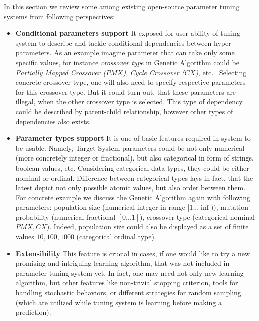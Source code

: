 In this section we review some among existing open-source parameter tuning systems from following perspectives:%
\begin{itemize}
	\item \textbf{Conditional parameters support} It exposed for user ability of tuning system to describe and tackle conditional dependencies between hyper-parameters. As an example imagine parameter that can take only some specific values, for instance \textit{crossover type} in Genetic Algorithm could be \textit{Partially Mapped Crossover ($PMX$)}, \textit{Cycle Crossover ($CX$)}, etc.~\cite{larranaga1999genetic} Selecting concrete crossover type, one will also need to specify respective parameters for this crossover type. But it could turn out, that these parameters are illegal, when the other crossover type is selected. This type of dependency could be described by parent-child relationship, however other types of dependencies also exists.
	
	\item \textbf{Parameter types support} It is one of basic features required in system to be usable. Namely, Target System parameters could be not only numerical (more concretely integer or fractional), but also categorical in form of strings, boolean values, etc. Considering categorical data types, they could be either nominal or ordinal. Difference between categorical types lays in fact, that the latest depict not only possible atomic values, but also order between them. For concrete example we discuss the Genetic Algorithm again with following parameters: population size (numerical integer in range $[1...\inf)$), mutation probability (numerical fractional $[0...1]$), crossover type (categorical nominal ${PMX, CX}$). Indeed, population size could also be displayed as a set of finite values ${10, 100, 1000}$ (categorical ordinal type).
	
	\item \textbf{Extensibility} This feature is crucial in cases, if one would like to try a new promising and intriguing learning algorithm, that was not included in parameter tuning system yet. In fact, one may need not only new learning algorithm, but other features like non-trivial stopping criterion, tools for handling stochastic behaviors, or different strategies for random sampling (which are utilized while tuning system is learning before making a prediction).
	

\end{itemize}
